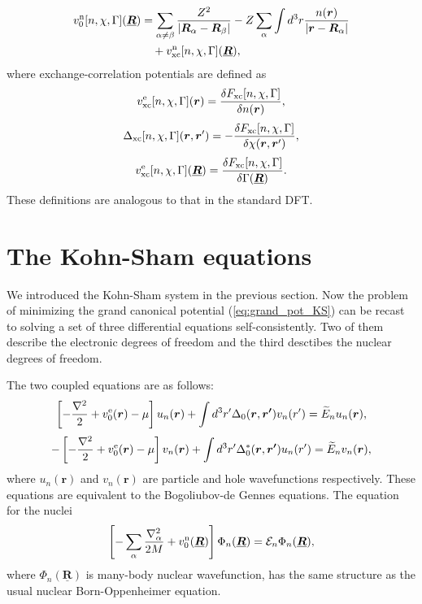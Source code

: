 %
\begin{equation} %
\begin{split}
	v^{\rm n}_0[n, \chi, \Gamma](\underline{\bm{R}}) &= \sum_{\alpha \neq \beta}
											\frac{Z^2}{|\bm{R}_\alpha - \bm{R}_\beta|}
										- Z\sum_{\alpha} \int d^3r \frac{n(\bm{r})}{|\bm{r} - \bm{R}_\alpha|} \\
										&\quad + v^{\rm n}_{\rm xc}[n, \chi, \Gamma](\underline{\bm{R}}),
\end{split}
\end{equation}
%
where exchange-correlation potentials are defined as 
%
\begin{equation}
	v^{\rm e}_{\rm xc}[n, \chi, \Gamma]({\bm r}) = \frac{\delta F_{\rm xc}[n, \chi, \Gamma]}{\delta n({\bm r})},
\end{equation}
%
\begin{equation}
	\Delta_{\rm xc}[n, \chi, \Gamma]({\bm r}, {\bm r'}) = - \frac{\delta F_{\rm xc}[n, \chi, \Gamma]}
							    {\delta \chi({\bm r}, {\bm r'})},
	\label{eq:Deltaxc}
\end{equation}
%
\begin{equation}
	v^{\rm e}_{\rm xc}[n, \chi, \Gamma](\underline{\bm{R}}) = \frac{\delta F_{\rm xc}[n, \chi, \Gamma]}
												{\delta \Gamma(\underline{\bm R})}.
\end{equation}
%
These definitions are analogous to that in the standard DFT.
%
%
\section{The Kohn-Sham equations}
%
We introduced the Kohn-Sham system in the previous section.
Now the problem of minimizing the grand canonical potential (\ref{eq:grand_pot_KS}) can be recast to
solving a set of three differential equations self-consistently.
Two of them describe the electronic degrees of freedom and the third desctibes the nuclear degrees of freedom.
%

The two coupled equations are as follows:
%
\begin{equation}
	\left[-\frac{\nabla^2}{2} + v^{\rm e}_0(\bm{r}) - \mu \right]u_n(\bm{r}) +
	\int d^3r'\Delta_0(\bm{r},\bm{r'})v_n({r'}) = \widetilde{E}_n u_n(\bm{r}),
	\label{eq:KS-BdG-par}
\end{equation}
%
\begin{equation}
	-\left[-\frac{\nabla^2}{2} + v^{\rm e}_0(\bm{r}) - \mu \right]v_n(\bm{r}) +
	\int d^3r'\Delta^{\ast}_0(\bm{r},\bm{r'})u_n({r'}) = \widetilde{E}_n v_n(\bm{r}),
	\label{eq:KS-BdG-hole}
\end{equation}
%
where $u_n(\bm{r})$ and $v_n(\bm{r})$ are particle and hole wavefunctions respectively.
These equations are equivalent to the Bogoliubov-de Gennes equations\cite{BdG1958}. %
The equation for the nuclei
%
\begin{equation}
	\left[-\sum_{\alpha}\frac{\nabla^2_\alpha}{2M} + v^{\rm n}_0(\underline{\bm{R}}) \right]
	\Phi_n(\underline{\bm{R}}) = {\mathcal E}_n\Phi_n(\underline{\bm{R}}),
	\label{eq:BO-approx}
\end{equation}
%
where $\Phi_n(\underline{\bm{R}})$ is many-body nuclear wavefunction, has the same structure as 
the usual nuclear Born-Oppenheimer equation.
%

